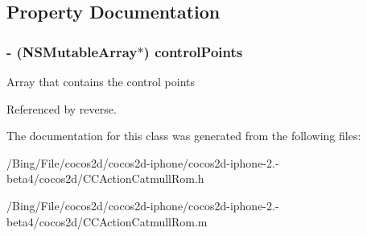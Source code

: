 \subsection{Property Documentation}
\hypertarget{interface_c_c_point_array_afdf0e4f9008cd5a8347fa8368e9a0c45}{
\subsubsection[{control\-Points}]{\setlength{\rightskip}{0pt plus 5cm}-\/ (N\-S\-Mutable\-Array$\ast$) {\bf control\-Points}}}\label{interface_c_c_point_array_afdf0e4f9008cd5a8347fa8368e9a0c45}
Array that contains the control points 

Referenced by reverse.



The documentation for this class was generated from the following files\-:\begin{DoxyCompactItemize}
\item 
/\-Bing/\-File/cocos2d/cocos2d-\/iphone/cocos2d-\/iphone-\/2.-\/beta4/cocos2d/C\-C\-Action\-Catmull\-Rom.\-h\item 
/\-Bing/\-File/cocos2d/cocos2d-\/iphone/cocos2d-\/iphone-\/2.-\/beta4/cocos2d/C\-C\-Action\-Catmull\-Rom.\-m\end{DoxyCompactItemize}
